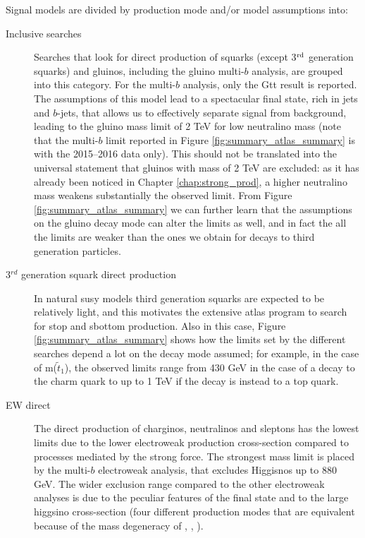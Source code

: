 Signal models are divided by production mode and/or model assumptions into:
\begin{description}

\item[Inclusive searches] Searches that look for direct production of squarks (except 3$^{\rm{rd}}$ generation squarks)
and gluinos, including the gluino multi-$b$ analysis, are grouped into this category. For the multi-$b$ analysis,
only the Gtt result is reported. The assumptions of this model lead to a spectacular final state, rich in jets and $b$-jets, that 
allows us to effectively separate signal from background, leading to the gluino mass limit of 2 TeV for low neutralino mass 
(note that the multi-$b$ limit reported in Figure \ref{fig:summary_atlas_summary} is with the 2015--2016 data only).
This should not be translated into the universal statement that gluinos with mass of 2 TeV are excluded: 
as it has already been noticed in Chapter \ref{chap:strong_prod}, a higher neutralino mass weakens substantially the observed limit.
From Figure \ref{fig:summary_atlas_summary} we can further learn that the assumptions on the gluino decay mode can alter the limits as well,
and in fact the all the limits are weaker than the ones we obtain for decays to third generation particles.

\item[3$^{rd}$ generation squark direct production] In natural \gls{susy} models third generation squarks are expected to be 
relatively light, and this motivates the extensive \gls{atlas} program to search for stop and sbottom production. 
Also in this case, Figure \ref{fig:summary_atlas_summary} shows how the limits set by the different searches depend a lot on the 
decay mode assumed; for example, in the case of m($\tilde{t}_1$), the observed limits range from 430 GeV in the case of a decay 
to the charm quark to up to 1 TeV if the decay is instead to a top quark.

\item[EW direct] The direct production of charginos, neutralinos and sleptons has the lowest limits due to the lower electroweak
production cross-section compared to processes mediated by the strong force. The strongest mass limit is placed by the multi-$b$ 
electroweak analysis, that excludes Higgisnos up to 880 GeV. The wider exclusion range compared to the other electroweak analyses
is due to the peculiar features of the final state and to the large higgsino cross-section (four different production modes that are equivalent 
because of the mass degeneracy of \ninoone, \ninotwo, \chinoonepm). 


\end{description}
